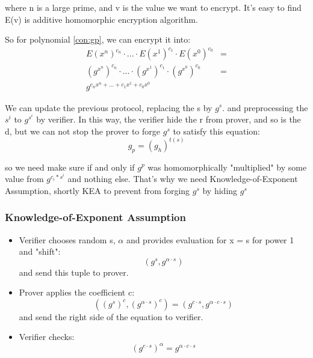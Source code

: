 \documentclass[a4paper,11pt]{article}
\begin{document}
where n is a large prime, and v is the value we want to encrypt.  It's easy to find E(v) is additive homomorphic encryption algorithm.

So for polynomial \ref{con:gp},  we can encrypt it into:
\begin{equation}
\begin{split}
E(x^n)^{c_n} \cdot ... \cdot E(x^1)^{c_1} \cdot E(x^0)^{c_0}  &=  \\
(g^{x^n})^{c_n} \cdot ... \cdot (g^{x^1})^{c_1} \cdot (g^{x^0})^{c_0} &= \\
g^{c_nx^n + ... + c_1x^1 + c_0x^0}
\end{split}
\end{equation}

We can update the previous protocol, replacing the s by $g^s$.  and preprocessing the $s^i$ to $g^{s^i}$ by verifier.  In this way,  the verifier hide the r from prover, and so is the d, but we can not stop the prover to forge $g^s$ to satisfy this equation:
\begin{equation}
g_p = (g_h)^{t(s)}
\end{equation}

so we need make sure if and only if $g^p$ was homomorphically "multiplied" by some value from $g^{c_i * s^i}$  and nothing else.  That's why we need Knowledge-of-Exponent Assumption, shortly KEA to prevent from forging $g^s$ by hiding $g^s$

\subsubsection{Knowledge-of-Exponent Assumption}

\begin{itemize}
\item Verifier chooses random s, $\alpha$ and  provides evaluation for x = s for power 1 and "shift":
\begin{equation}
(g^s, g^{\alpha \cdot s})
\end{equation}
and send this tuple to prover.
\item Prover applies the coefficient c:  
\begin{equation}
((g^s)^c, (g^{\alpha \cdot s})^c) = (g^{c\cdot s}, g^{\alpha\cdot c \cdot s})
\end{equation}
and send the right side of the equation to verifier.
\item Verifier checks:
\begin{equation}
(g^{c\cdot s})^{\alpha} =  g^{\alpha\cdot c \cdot s}
\end{equation}
\end{itemize}
\end{document}
